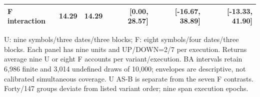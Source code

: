 \begin{table}[!htbp]
\begin{tabular}{lrrrrr}
F interaction & 14.29 & 14.29 & [0.00, 28.57] & [-16.67, 38.89] & [-13.33, 41.90] \\
\hline
\end{tabular}\par\medskip
\begin{minipage}{\textwidth}\footnotesize U: nine symbols/three dates/three blocks; F: eight symbols/four dates/three blocks. Each panel has nine units and UP/DOWN=2/7 per execution. Returns average nine U or eight F accounts per variant/execution. BA intervals retain 6,986 finite and 3,014 undefined draws of 10,000; envelopes are descriptive, not calibrated simultaneous coverage. U AS-B is separate from the seven F contrasts. Forty/147 groups deviate from listed variant order; nine span execution epochs.\end{minipage}
\end{table}
